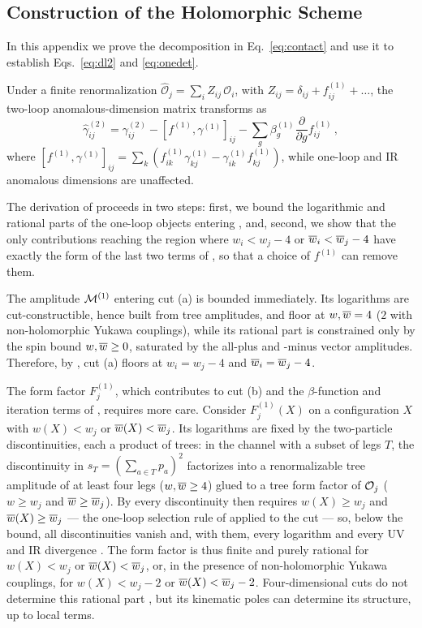 \begin{subappendices}

\section{Construction of the Holomorphic Scheme\label{app:holomorphicscheme}}

In this appendix we prove the decomposition in Eq.~\eqref{eq:contact} and use it to establish
Eqs.~\eqref{eq:dl2} and \eqref{eq:onedet}.

Under a finite renormalization
$\widehat{\mathcal O}_j = \sum_i Z_{ij}\,\mathcal O_i$, with $Z_{ij} = \delta_{ij} + f^{(1)}_{ij} + \dots$, the two-loop anomalous-dimension matrix transforms as \cite{Bern:2020ikv}
\begin{equation}
\widehat\gamma^{(2)}_{ij}
=\gamma^{(2)}_{ij}
-[f^{(1)},\gamma^{(1)}]_{ij}
-\sum_g\beta^{(1)}_g\frac{\partial}{\partial g} f^{(1)}_{ij}\,,
\label{eq:cov}
\end{equation}
where $[f^{(1)},\gamma^{(1)}]_{ij} = \sum_k (f^{(1)}_{ik}\gamma^{(1)}_{kj} - \gamma^{(1)}_{ik}f^{(1)}_{kj})$, while one-loop and IR anomalous dimensions are unaffected.

The derivation of  proceeds in two steps: first, we bound the logarithmic and rational parts of the one-loop objects entering , and, second, we show that the only contributions reaching the region where $w_i < w_j - 4$ or $\overline{w}_i < \overline{w}_j - 4$ have exactly the form of the last two terms of , so that a choice of $f^{(1)}$ can remove them.

The amplitude $\mathcal{M}^{(1)}$ entering cut (a) is bounded immediately.
Its logarithms are cut-constructible, hence built from tree amplitudes, and floor at $w,\overline{w} = 4$ ($2$ with non-holomorphic Yukawa couplings), while its rational part is constrained only by the spin bound $w,\overline{w} \ge 0$, saturated by the all-plus and -minus vector amplitudes.
Therefore, by , cut (a) floors at $w_i = w_j - 4$ and $\overline{w}_i = \overline{w}_j - 4$.

The form factor $F^{(1)}_j$, which contributes to cut (b) and the $\beta$-function and iteration terms of , requires more care.
Consider $F^{(1)}_j(X)$ on a configuration $X$ with $w(X) < w_j$ or $\overline{w}(X) < \overline{w}_j$.
Its logarithms are fixed by the two-particle discontinuities, each a product of trees: in the channel with a subset of legs $T$,
the discontinuity in $s_T = (\sum_{a \in T} p_a)^2$ factorizes into a renormalizable tree amplitude of at least four legs ($w,\overline{w} \ge 4$)
glued to a tree form factor of $\mathcal{O}_j$ ($w \ge w_j$ and $\overline{w} \ge \overline{w}_j$).
By  every discontinuity then requires $w(X) \ge w_j$ and $\overline{w}(X) \ge \overline{w}_j$ --- the one-loop selection rule of  applied to the cut --- so, below the bound, all discontinuities vanish and, with them, every logarithm and every UV and IR divergence \cite{Craig:2019wmo}.
The form factor is thus finite and purely rational for $w(X) < w_j$ or $\overline{w}(X) < \overline{w}_j$, or, in the presence of non-holomorphic Yukawa couplings, for $w(X) <w_j-2$ or $\overline{w}(X) <\overline{w}_j-2$.
Four-dimensional cuts do not determine this rational part \cite{Bern:1994zx},
but its kinematic poles can determine its structure, up to local terms.


\end{subappendices}
